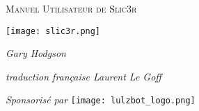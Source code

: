 \date {}
\thispagestyle{empty}
\begingroup
\centering 

\begin{center}
{\Huge \scshape Manuel Utilisateur de Slic3r}

\end{center}

\vspace{30mm}

\begin{center}
\texttt{[image: slic3r.png]}

\vspace{20mm}

{\large \itshape Gary Hodgson}

\vspace{7mm}

{\large \itshape traduction fran\c{c}aise  Laurent Le Goff}

\vspace{13mm}

{\large \itshape Sponsoris\'e par }
\texttt{[image: lulzbot\_logo.png]}

\end{center}
\endgroup

